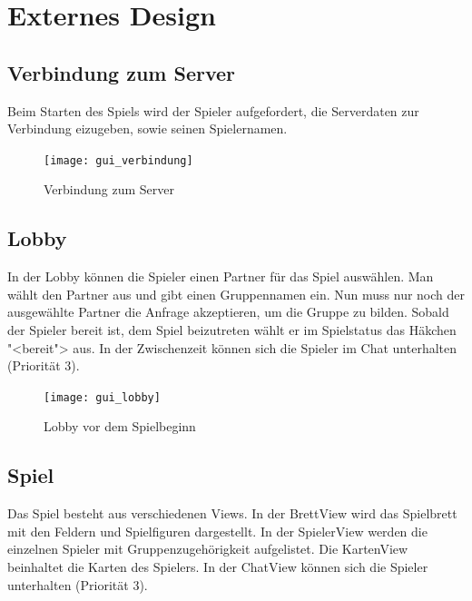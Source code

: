 \documentclass[12pt,halfparskip]{scrartcl}
\begin{document}
\section{Externes Design} %
\label{externes_design}

\subsection{Verbindung zum Server} %
\label{externes_design_verbindung}

Beim Starten des Spiels wird der Spieler aufgefordert, die Serverdaten zur Verbindung eizugeben, sowie seinen Spielernamen.

\begin{figure}[h]
	\centering
	\texttt{[image: gui\_verbindung]}
	\caption{Verbindung zum Server}
	\label{fig:gui_verbindung}
\end{figure}

\clearpage

\subsection{Lobby} %
\label{externes_design_lobby}

In der Lobby können die Spieler einen Partner für das Spiel auswählen. Man wählt den Partner aus und gibt einen Gruppennamen ein. Nun muss nur noch der ausgewählte Partner die Anfrage akzeptieren, um die Gruppe zu bilden. Sobald der Spieler bereit ist, dem Spiel beizutreten wählt er im Spielstatus das Häkchen "<bereit"> aus. In der Zwischenzeit können sich die Spieler im Chat unterhalten (Priorität 3).

\begin{figure}[h]
	\centering
	\texttt{[image: gui\_lobby]}
	\caption{Lobby vor dem Spielbeginn}
	\label{fig:gui_lobby}
\end{figure}

\clearpage

\subsection{Spiel} %
\label{externes_design_spielbrett}

Das Spiel besteht aus verschiedenen Views. In der BrettView wird das Spielbrett mit den Feldern und Spielfiguren dargestellt. In der SpielerView werden die einzelnen Spieler mit Gruppenzugehörigkeit aufgelistet. Die KartenView beinhaltet die Karten des Spielers. In der ChatView können sich die Spieler unterhalten (Priorität 3).
\end{document}
